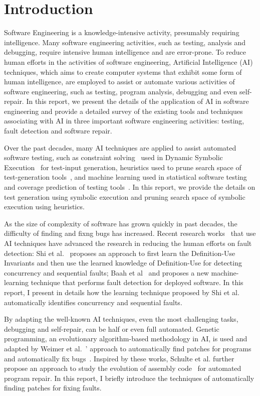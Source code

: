 \section{Introduction} 
Software Engineering is a knowledge-intensive activity, presumably requiring intelligence. Many software engineering activities, such as testing, analysis and debugging, require intensive human intelligence and are error-prone. To reduce human efforts in the activities of software engineering, Artificial Intelligence (AI) techniques, which aims to create computer systems that exhibit some form of human intelligence, are employed to assist or automate various activities of software engineering, such as testing, program analysis, debugging and even self-repair. In this report, we present the details of the application of AI in software engineering and provide a detailed survey of the existing tools and techniques associating with AI in three important software engineering activities: testing, fault detection and software repair.

Over the past decades, many AI techniques are applied to assist automated software testing, such as constraint solving~\cite{constraintsolving} used in Dynamic Symbolic Execution~\cite{symbolic, dart, cute} for test-input generation, heuristics used to prune search space of test-generation tools~\cite{prune,fitness}, and machine learning used in statistical software testing~\cite{mlinstatistics} and coverage prediction of testing tools~\cite{predictCoverage}. In this report, we provide the details on test generation using symbolic execution and pruning search space of symbolic execution using heuristics.

As the size of complexity of software has grown quickly in past decades, the difficulty of finding and fixng bugs has increased. Recent research works~\cite{wrongDefinition,online} that use AI techniques have advanced the research in reducing the human efforts on fault detection: Shi et al.~\cite{wrongDefinition} proposes an approach to first learn the Definition-Use Invariants and then use the learned knowledge of Definition-Use for detecting concurrency and sequential faults; Baah et al~\cite{online} and proposes a new machine-learning technique that performs fault detection for deployed software. In this report, I present in details how the learning technique proposed by Shi et al. automatically identifies concurrency and sequential faults.

By adapting the well-known AI techniques, even the most challenging tasks, debugging and self-repair, can be half or even full automated. Genetic programming, an evolutionary algorithm-based methodology in AI, is used and adapted by Weimer et al.~\cite{geneticPatch}' approach to automatically find patches for programs and automatically fix bugs~\cite{repair}. Inspired by these works, Schulte et al. further propose an approach to study the evolution of assembly code~\cite{evolutionaryComputation} for automated program repair. In this report, I briefly introduce the techniques of automatically finding patches for fixing faults.



